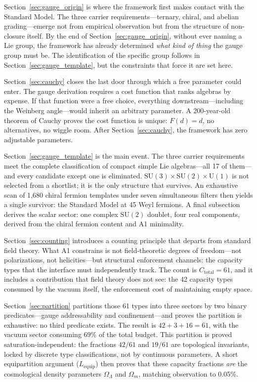 \documentclass[11pt]{article}
\newcommand{\SU}{\mathrm{SU}}
\newcommand{\U}{\mathrm{U}}
\begin{document}
Section~\ref{sec:gauge_origin} is where the framework first makes contact with the Standard Model.  The three carrier requirements---ternary, chiral, and abelian grading---emerge not from empirical observation but from the structure of non-closure itself.  By the end of Section~\ref{sec:gauge_origin}, without ever naming a Lie group, the framework has already determined \emph{what kind of thing} the gauge group must be.  The identification of the specific group follows in Section~\ref{sec:gauge_template}, but the constraints that force it are set here.

Section~\ref{sec:cauchy} closes the last door through which a free parameter could enter.  The gauge derivation requires a cost function that ranks algebras by expense.  If that function were a free choice, everything downstream---including the Weinberg angle---would inherit an arbitrary parameter.  A 200-year-old theorem of Cauchy proves the cost function is unique: $F(d) = d$, no alternatives, no wiggle room.  After Section~\ref{sec:cauchy}, the framework has zero adjustable parameters.

Section~\ref{sec:gauge_template} is the main event.  The three carrier requirements meet the complete classification of compact simple Lie algebras---all 17 of them---and every candidate except one is eliminated.  $\SU(3) \times \SU(2) \times \U(1)$ is not selected from a shortlist; it is the only structure that survives.  An exhaustive scan of 1{,}680 chiral fermion templates under seven simultaneous filters then yields a single survivor: the Standard Model at 45 Weyl fermions.  A final subsection derives the scalar sector: one complex $\SU(2)$ doublet, four real components, derived from the chiral fermion content and A1 minimality.

Section~\ref{sec:counting} introduces a counting principle that departs from standard field theory.  What A1 constrains is not field-theoretic degrees of freedom---not polarizations, not helicities---but structural enforcement channels: the capacity types that the interface must independently track.  The count is $C_{\mathrm{total}} = 61$, and it includes a contribution that field theory does not see: the 42 capacity types consumed by the vacuum itself, the enforcement cost of maintaining empty space.

Section~\ref{sec:partition} partitions those 61 types into three sectors by two binary predicates---gauge addressability and confinement---and proves the partition is exhaustive: no third predicate exists.  The result is $42 + 3 + 16 = 61$, with the vacuum sector consuming 69\% of the total budget.  This partition is proved saturation-independent: the fractions $42/61$ and $19/61$ are topological invariants, locked by discrete type classifications, not by continuous parameters.  A short equipartition argument ($L_{\mathrm{equip}}$) then proves that these capacity fractions \emph{are} the cosmological density parameters $\Omega_\Lambda$ and $\Omega_m$, matching observation to 0.05\%.
\end{document}
